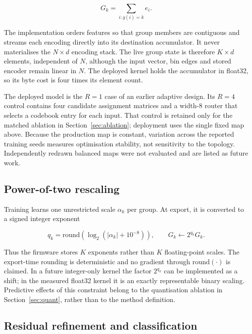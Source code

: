 \documentclass[10pt,letterpaper,twocolumn]{article}
\begin{document}
\begin{equation}
\label{eq:group}
G_k=\sum_{i:g(i)=k}e_i.
\end{equation}

The implementation orders features so that group members are contiguous and
streams each encoding directly into its destination accumulator. It never
materialises the $N\times d$ encoding stack. The live group state is therefore
$K\times d$ elements, independent of $N$, although the input vector, bin edges
and stored encoder remain linear in $N$. The deployed kernel holds the
accumulator in float32, so its byte cost is four times its element count.

The deployed model is the $R=1$ case of an earlier adaptive design. Its
$R=4$ control contains four candidate assignment matrices and a width-8 router
that selects a codebook entry for each input. That control is retained only for
the matched ablation in Section~\ref{sec:ablation}; deployment uses the single
fixed map above. Because the production map is constant, variation across the
reported training seeds measures optimisation stability, not sensitivity to
the topology. Independently redrawn balanced maps were not evaluated and are
listed as future work.

\subsection{Power-of-two rescaling}
\label{sec:method:pow2}

Training learns one unrestricted scale $\alpha_k$ per group. At export, it is
converted to a signed integer exponent

\begin{equation}
\label{eq:pow2}
q_k=\mathrm{round}\!\left(\log_2(|\alpha_k|+10^{-8})\right),\qquad
G_k\leftarrow 2^{q_k}G_k.
\end{equation}

Thus the firmware stores $K$ exponents rather than $K$ floating-point scales.
The export-time rounding is deterministic and no gradient through
$\mathrm{round}(\cdot)$ is claimed. In a future integer-only kernel the factor
$2^{q_k}$ can be implemented as a shift; in the measured float32 kernel it is
an exactly representable binary scaling. Predictive effects of this constraint
belong to the quantisation ablation in Section~\ref{sec:quant}, rather than to
the method definition.

\subsection{Residual refinement and classification}
\label{sec:method:head}
\end{document}
